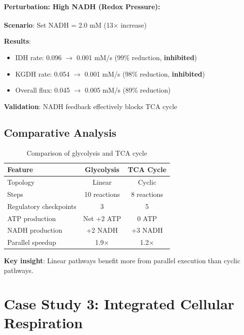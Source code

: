 \paragraph{Perturbation: High NADH (Redox Pressure):}

\textbf{Scenario}: Set NADH = 2.0 mM (13$\times$ increase)

\textbf{Results}:

\begin{itemize}
    \item IDH rate: 0.096 $\to$ 0.001 mM/s (99\% reduction, \textbf{inhibited})
    \item KGDH rate: 0.054 $\to$ 0.001 mM/s (98\% reduction, \textbf{inhibited})
    \item Overall flux: 0.045 $\to$ 0.005 mM/s (89\% reduction)
\end{itemize}

\textbf{Validation}: NADH feedback effectively blocks TCA cycle \checkmark

\subsection{Comparative Analysis}
\label{subsec:comparative-analysis}

\begin{table}[h]
\centering
\begin{tabular}{@{}lcc@{}}
\toprule
\textbf{Feature} & \textbf{Glycolysis} & \textbf{TCA Cycle} \\
\midrule
Topology & Linear & Cyclic \\
Steps & 10 reactions & 8 reactions \\
Regulatory checkpoints & 3 & 5 \\
ATP production & Net +2 ATP & 0 ATP \\
NADH production & +2 NADH & +3 NADH \\
Parallel speedup & 1.9$\times$ & 1.2$\times$ \\
\bottomrule
\end{tabular}
\caption{Comparison of glycolysis and TCA cycle}
\label{tab:glycolysis-vs-tca}
\end{table}

\textbf{Key insight}: Linear pathways benefit more from parallel execution than cyclic pathways.

\section{Case Study 3: Integrated Cellular Respiration}
\label{sec:case-study-respiration}

